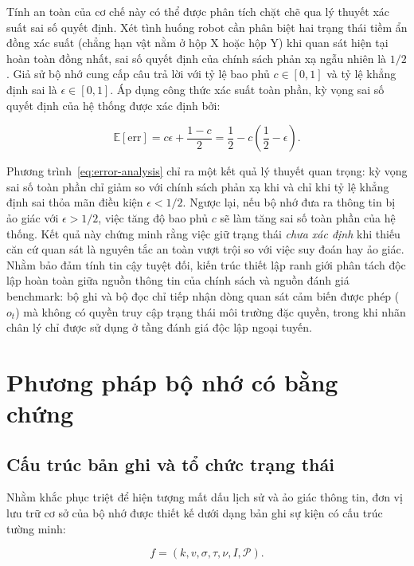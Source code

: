 Tính an toàn của cơ chế này có thể được phân tích chặt chẽ qua lý thuyết xác suất sai số quyết định. Xét tình huống robot cần phân biệt hai trạng thái tiềm ẩn đồng xác suất (chẳng hạn vật nằm ở hộp X hoặc hộp Y) khi quan sát hiện tại hoàn toàn đồng nhất, sai số quyết định của chính sách phản xạ ngẫu nhiên là $1/2$. Giả sử bộ nhớ cung cấp câu trả lời với tỷ lệ bao phủ $c \in [0, 1]$ và tỷ lệ khẳng định sai là $\epsilon \in [0, 1]$. Áp dụng công thức xác suất toàn phần, kỳ vọng sai số quyết định của hệ thống được xác định bởi:

\begin{equation}
\mathbb E[\text{err}] = c\epsilon + \frac{1-c}{2} = \frac{1}{2} - c\left(\frac{1}{2} - \epsilon\right).
\label{eq:error-analysis}
\end{equation}

Phương trình~\eqref{eq:error-analysis} chỉ ra một kết quả lý thuyết quan trọng: kỳ vọng sai số toàn phần chỉ giảm so với chính sách phản xạ khi và chỉ khi tỷ lệ khẳng định sai thỏa mãn điều kiện $\epsilon < 1/2$. Ngược lại, nếu bộ nhớ đưa ra thông tin bị ảo giác với $\epsilon > 1/2$, việc tăng độ bao phủ $c$ sẽ làm tăng sai số toàn phần của hệ thống. Kết quả này chứng minh rằng việc giữ trạng thái \textit{chưa xác định} khi thiếu căn cứ quan sát là nguyên tắc an toàn vượt trội so với việc suy đoán hay ảo giác. Nhằm bảo đảm tính tin cậy tuyệt đối, kiến trúc thiết lập ranh giới phân tách độc lập hoàn toàn giữa nguồn thông tin của chính sách và nguồn đánh giá benchmark: bộ ghi và bộ đọc chỉ tiếp nhận dòng quan sát cảm biến được phép ($o_t$) mà không có quyền truy cập trạng thái môi trường đặc quyền, trong khi nhãn chân lý chỉ được sử dụng ở tầng đánh giá độc lập ngoại tuyến.

\section{Phương pháp bộ nhớ có bằng chứng}

\subsection{Cấu trúc bản ghi và tổ chức trạng thái}

Nhằm khắc phục triệt để hiện tượng mất dấu lịch sử và ảo giác thông tin, đơn vị lưu trữ cơ sở của bộ nhớ được thiết kế dưới dạng bản ghi sự kiện có cấu trúc tường minh:

\begin{equation}
f = (k, v, \sigma, \tau, \nu, I, \mathcal P).
\label{eq:record-tuple}
\end{equation}

